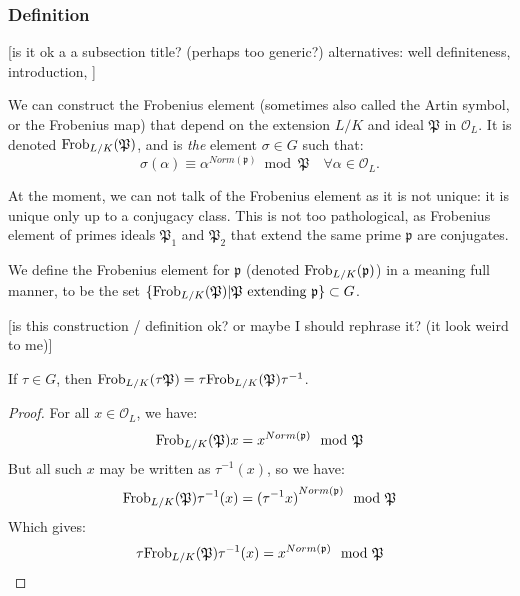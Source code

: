 \subsubsection{Definition}
[is it ok a a subsection title? (perhaps too generic?) alternatives: well definiteness, introduction,  ]

We can construct the Frobenius element (sometimes also called the Artin symbol, or the Frobenius map) that depend on the extension $L/K$ and ideal $\mathfrak{P}$ in $\mathcal{O}_L$.
It is denoted $\text{Frob}_{L/K}(\mathfrak{P})$, and is \textit{the} element $\sigma \in G$ such that:
$$
\sigma(\alpha) \equiv \alpha^{Norm(\mathfrak{p})} \bmod{\mathfrak{P}} \quad \forall \alpha \in \mathcal{O}_L.
$$

At the moment, we can not talk of the Frobenius element as it is not unique: it is unique only up to a conjugacy class.
This is not too pathological, as Frobenius element of primes ideals $\mathfrak{P}_1$ and $\mathfrak{P}_2$ that extend the same prime $\mathfrak{p}$ are conjugates.

We define the Frobenius element for $\mathfrak{p}$ (denoted $\text{Frob}_{L/K}(\mathfrak{p})$) in a meaning full manner, to be the set $\{ \text{Frob}_{L/K}(\mathfrak{P}) | \mathfrak{P} \text{ extending } \mathfrak{p} \} \subset G$.

[is this construction / definition ok? or maybe I should rephrase it? (it look weird to me)]

\begin{property}
	If $\tau \in G$, then 
	$\text{Frob}_{L/K}(\mathfrak{\tau P}) = \tau \text{Frob}_{L/K}(\mathfrak{P}) \tau^{-1}$.
\end{property}
\begin{proof}
	For all $x \in \mathcal{O}_L$, we have:
	$$
	\text{Frob}_{L/K}(\mathfrak{P})x 
	= x^{Norm(\mathfrak{p})} \mod \mathfrak{P}
	$$
	But all such $x$ may be written as $\tau^{-1}(x)$, so we have:
	$$
	\text{Frob}_{L/K}(\mathfrak{P}) \tau^{-1}(x) 
	= {(\tau^{-1} x)}^{Norm(\mathfrak{p})} \mod \mathfrak{P}
	$$
	Which gives:
	$$
	\tau \text{Frob}_{L/K}(\mathfrak{P})\tau^{-1}(x) 
	= x^{Norm(\mathfrak{p})} \mod \mathfrak{P}
	$$
\end{proof}


